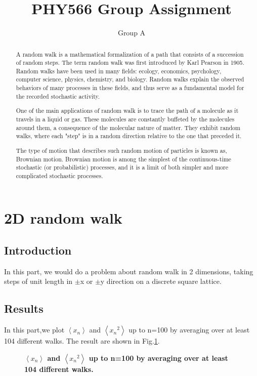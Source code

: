 \documentclass[11pt, oneside]{article}  	%
\title{{\bf PHY566 Group Assignment }}
\author{Group A}
\affil{Tong Zhu, Jiyingmei Wang, Aritro Pathak, Ankur Manikandan}
\begin{document}
\maketitle


\begin{abstract}
A random walk is a mathematical formalization of a path that consists of a succession of random steps. The term random walk was first introduced by Karl Pearson in 1905.  Random walks have been used in many fields: ecology, economics, psychology, computer science, physics, chemistry, and biology.  Random walks explain the observed behaviors of many processes in these fields, and thus serve as a fundamental model for the recorded stochastic activity. 

One of the main applications of random walk is to trace the path of a molecule as it travels in a liquid or gas. These molecules are constantly buffeted by the molecules around them, a consequence of the molecular nature of matter. They exhibit random walks, where each "step" is in a random direction relative to the one that preceded it.

The type of motion that describes such random motion of particles is known as, Brownian motion. Brownian motion is among the simplest of the continuous-time stochastic (or probabilistic) processes, and it is a limit of both simpler and more complicated stochastic processes. 
\end{abstract}


\section{2D random walk}
\subsection{Introduction}
In this part, we would do a problem about random walk in 2 dimensions, taking steps of unit length in $\pm$x or $\pm$y direction on a discrete square lattice.
\subsection{Results}
In this part,we plot $\left \langle x_n \right\rangle$ and $\left \langle {x_n}^2 \right\rangle$ up to n=100 by averaging over at least 104 different walks. The result are shown in Fig.\ref{figrw1}.

\begin{figure}[h]
\begin{center}
\caption{{\bf $\left \langle x_n \right\rangle$ and $\left \langle {x_n}^2 \right\rangle$ up to n=100 by averaging over at least 104 different walks. }}
\label{figrw1}
\end{center}
\end{figure}
\end{document}
